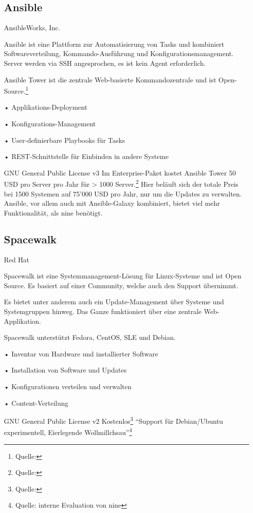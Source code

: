 \clearpage
\subsection*{Ansible}

{AnsibleWorks, Inc.}
{Ansible ist eine Plattform zur Automatisierung von Tasks und kombiniert Softwareverteilung, Kommando-Ausführung und Konfigurationsmanagement. Server werden via SSH angesprochen, es ist kein Agent erforderlich.

Ansible Tower ist die zentrale Web-basierte Kommandozentrale und ist Open-Source.\footnote{Quelle: }}
{
• Applikations-Deployment

• Konfigurations-Management

• User-definierbare Playbooks für Tasks

• REST-Schnittstelle für Einbinden in andere Systeme
}
{GNU General Public License v3}
{Im Enterprise-Paket kostet Ansible Tower 50 USD pro Server pro Jahr für > 1000 Server.\footnote{Quelle: }}
{}
{Hier beläuft sich der totale Preis bei 1500 Systemen auf 75'000 USD pro Jahr, nur um die Updates zu verwalten. Ansible, vor allem auch mit Ansible-Galaxy kombiniert, bietet viel mehr Funktionalität, als \gls{nine} benötigt.}

\subsection*{Spacewalk} \label{sec:analysis:competition:spacewalk}

{Red Hat}
{Spacewalk ist eine Systemmanagement-Lösung für Linux-Systeme und ist Open Source. Es basiert auf einer Community, welche auch den Support übernimmt.

Es bietet unter anderem auch ein Update-Management über Systeme und Systemgruppen hinweg. Das Ganze funktioniert über eine zentrale Web-Applikation.

Spacewalk unterstützt Fedora, CentOS, SLE und Debian.}
{
• Inventar von Hardware und installierter Software

• Installation von Software und Updates

• Konfigurationen verteilen und verwalten

• Content-Verteilung
}
{GNU General Public License v2}
{Kostenlos\footnote{Quelle: }}
{}
{``Support für Debian/Ubuntu experimentell, Eierlegende Wollmillchsau''\footnote{Quelle: interne Evaluation von \gls{nine}}}

